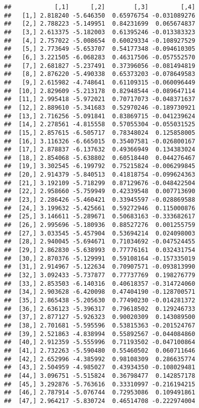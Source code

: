\documentclass[
]{article}
\begin{document}
\begin{verbatim}
##            [,1]      [,2]        [,3]         [,4]
##   [1,] 2.818240 -5.646350  0.65976754 -0.031089276
##   [2,] 2.788223 -5.149951  0.84231699  0.065674837
##   [3,] 2.613375 -5.182003  0.61395246 -0.013383323
##   [4,] 2.757022 -5.008654  0.60029334 -0.108927529
##   [5,] 2.773649 -5.653707  0.54177348 -0.094610305
##   [6,] 3.221505 -6.068283  0.46317506 -0.057552570
##   [7,] 2.681827 -5.237491  0.37396056 -0.081494819
##   [8,] 2.876220 -5.490338  0.65373203 -0.078649583
##   [9,] 2.615982 -4.748641  0.61109315 -0.060096449
##  [10,] 2.829609 -5.213178  0.82948544 -0.089647114
##  [11,] 2.995418 -5.972021  0.70717073 -0.048371637
##  [12,] 2.889610 -5.341683  0.52970246 -0.189730921
##  [13,] 2.716256 -5.091841  0.83869715 -0.041239624
##  [14,] 2.278561 -4.815558  0.57055304 -0.055031525
##  [15,] 2.857615 -6.505717  0.78348024  0.125858005
##  [16,] 3.116326 -6.665015  0.35407581 -0.026800167
##  [17,] 2.878837 -6.137632  0.49366949  0.134383024
##  [18,] 2.854068 -5.638802  0.60518440  0.044276467
##  [19,] 3.302545 -6.199792  0.75215824 -0.006299845
##  [20,] 2.914379 -5.840513  0.41818754 -0.099624363
##  [21,] 3.192109 -5.718299  0.87129676 -0.048422504
##  [22,] 2.958660 -5.759949  0.42339548  0.007713690
##  [23,] 2.286426 -5.460421  0.33945597 -0.028869588
##  [24,] 3.199632 -5.425661  0.59272946  0.115000876
##  [25,] 3.146611 -5.289671  0.50683163 -0.333682617
##  [26,] 2.995696 -5.180936  0.88527276  0.001255759
##  [27,] 3.033545 -5.457904  0.53694214  0.024098003
##  [28,] 2.940045 -5.694671  0.71034692 -0.047524455
##  [29,] 2.862830 -5.638993  0.77776161  0.032431754
##  [30,] 2.870376 -5.129991  0.59108164 -0.157335019
##  [31,] 2.914967 -5.122634  0.70907571 -0.093813990
##  [32,] 3.092433 -5.737877  0.77737769  0.198276779
##  [33,] 2.853503 -6.140316  0.40618357 -0.314724060
##  [34,] 2.903628 -6.420098  0.47404190 -0.128700571
##  [35,] 2.865438 -5.205630  0.77490230 -0.014281372
##  [36,] 2.636123 -5.396317  0.79618502  0.129246733
##  [37,] 2.877127 -5.926323  0.90020309  0.143089500
##  [38,] 2.701681 -5.595596  0.53815363 -0.201524767
##  [39,] 2.521863 -4.838994  0.55892567 -0.044084860
##  [40,] 2.912359 -5.555996  0.71193502 -0.047100864
##  [41,] 2.732263 -5.590480  0.55460502  0.060711646
##  [42,] 2.652996 -4.385992  0.98108309  0.286635774
##  [43,] 2.504959 -4.985027  0.43934350 -0.108029481
##  [44,] 3.096751 -5.515824  0.36798477  0.142857178
##  [45,] 3.292876 -5.763616  0.33310997 -0.216194215
##  [46,] 2.787914 -5.076744  0.72953086  0.109491861
##  [47,] 2.964217 -5.830724  0.46514708 -0.222974004

\end{verbatim}
\end{document}
